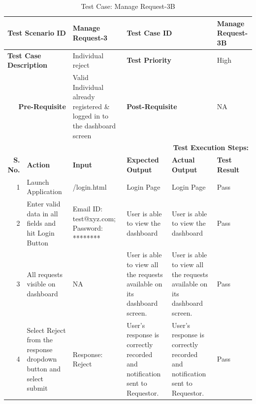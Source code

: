 \documentclass[a4paper, hidelinks, 12pt]{report}
\begin{document}
\begin{itemize}
\begin{table}[H]
  \centering
  \caption{Test Case: Manage Request-3B}
    \begin{tabular}{|r|p{4.355em}|p{7.715em}|p{6.43em}|p{5.855em}|p{5.07em}|}
    \toprule
    \multicolumn{2}{|p{13.425em}|}{\textbf{Test Scenario ID}} & Manage Request-3 & \multicolumn{2}{p{12.285em}|}{\textbf{Test Case ID}} & Manage Request-3B \\
    \midrule
    \multicolumn{2}{|l|}{\multirow{2}[2]{*}{\textbf{Test Case Description}}} & \multirow{2}[2]{*}{Individual reject} & \multicolumn{2}{l|}{\multirow{2}[2]{*}{\textbf{Test Priority}}} & \multirow{2}[2]{*}{High} \\
    \multicolumn{2}{|l|}{} & \multicolumn{1}{l|}{} & \multicolumn{2}{l|}{} & \multicolumn{1}{l|}{} \\
    \midrule
    \multicolumn{2}{|p{13.425em}|}{\textbf{Pre-Requisite}} & Valid Individual already registered \& logged in to the dashboard screen & \multicolumn{2}{p{12.285em}|}{\textbf{Post-Requisite}} & NA \\
    \midrule
    \multicolumn{6}{p{38.495em}|}{\textbf{Test Execution Steps:}} \\
    \midrule
    \multicolumn{1}{|p{5.07em}|}{\textbf{S. No.}} & \textbf{Action } & \textbf{Input} & \textbf{Expected Output} & \textbf{Actual Output} & \textbf{Test Result} \\
    \midrule
    1     & Launch Application & /login.html & Login Page & Login Page & Pass \\
    \midrule
    2     & Enter valid data in all fields and hit Login Button & Email ID: test@xyz.com; Password: ******** & User is able to view the dashboard & User is able to view the dashboard & Pass \\
    \midrule
    3     & All requests visible on dashboard & NA    & User is able to view all the requests available on its dashboard screen. & User is able to view all the requests available on its dashboard screen. & Pass \\
    \midrule
    4     & Select Reject from the response dropdown button and select submit & Response: Reject & User's response is correctly recorded and notification sent to Requestor. & User's response is correctly recorded and notification sent to Requestor. & Pass \\
    \bottomrule
    \end{tabular}%
  \label{tab:Test Case: Manage Request-3B}%
\end{table}%

\end{itemize}
\end{document}

